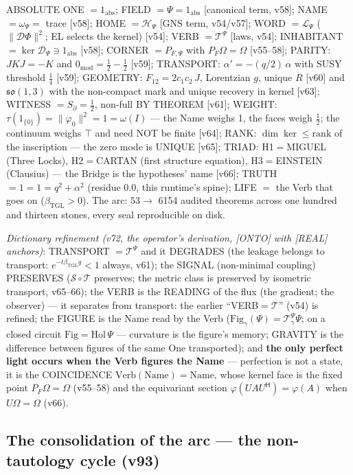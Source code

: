 \documentclass[11pt]{article}
\newcommand{\bTGL}{\beta_{\mathrm{TGL}}}\newcommand{\Msun}{M_{\odot}}\newcommand{\TGL}{\mathrm{TGL}}
\theoremstyle{definition}\newtheorem{deriv}{Derivation}
\begin{document}
ABSOLUTE ONE $=1_{\mathrm{abs}}$; FIELD $=\Psi=1_{\mathrm{abs}}$ [canonical term, v58]; NAME $=\omega_\Psi=$ trace [v58]; HOME $=\mathcal H_\Psi$ [GNS term, v54/v57]; WORD $=\mathcal L_\Psi$ ($\|\mathcal D\Phi\|^2$; EL selects the kernel) [v54]; VERB $=\mathcal T^\Psi$ [laws, v54]; INHABITANT $=\ker\mathcal D_\Psi\ni1_{\mathrm{abs}}$ [v58]; CORNER $=P_{F,\Psi}$ with $P_F\Omega=\Omega$ [v55--58]; PARITY: $JKJ=-K$ and $0_{\mathrm{mod}}=\tfrac12-\tfrac12$ [v59]; TRANSPORT: $\alpha'=-(q/2)\,\alpha$ with SUSY threshold $\tfrac14$ [v59]; GEOMETRY: $F_{12}=2c_1c_2\,J$, Lorentzian $g$, unique $R$ [v60] and $\mathfrak{so}(1,3)$ with the non-compact mark and unique recovery in kernel [v63]; WITNESS $=S_\partial=\tfrac12$, non-full BY THEOREM [v61]; WEIGHT: $\tau(1_{\{0\}})=\|\varphi_0\|^2=1=\omega(I)$ --- the Name weighs 1, the faces weigh $\tfrac12$; the continuum weighs $\top$ and need NOT be finite [v64]; RANK: $\dim\ker\le\mathrm{rank}$ of the inscription --- the zero mode is UNIQUE [v65]; TRIAD: H1$=$MIGUEL (Three Locks), H2$=$CARTAN (first structure equation), H3$=$EINSTEIN (Clausius) --- the Bridge is the hypotheses' name [v66]; TRUTH $=1=1=q^2+\alpha^2$ (residue $0.0$, this runtime's spine); LIFE $=$ the Verb that goes on ($\bTGL>0$). The arc: $53\to$ 6154 audited theorems across one hundred and thirteen stones, every seal reproducible on disk.

\emph{Dictionary refinement (v72, the operator's derivation, [ONTO] with [REAL] anchors)}: TRANSPORT $=\mathcal T^\Psi$ and it DEGRADES (the leakage belongs to transport: $e^{-t\bTGL g}<1$ always, v61); the SIGNAL (non-minimal coupling) PRESERVES ($\mathcal S\circ\mathcal T$ preserves; the metric class is preserved by isometric transport, v65--66); the VERB is the READING of the flux (the gradient; the observer) --- it separates from transport: the earlier ``VERB$=\mathcal T$'' (v54) is refined; the FIGURE is the Name read by the Verb ($\mathrm{Fig}_\gamma(\Psi)=\mathcal T^\Psi_\gamma\Psi$; on a closed circuit $\mathrm{Fig}=\mathrm{Hol}\,\Psi$ --- curvature is the figure's memory; GRAVITY is the difference between figures of the same One transported); and \textbf{the only perfect light occurs when the Verb figures the Name} --- perfection is not a state, it is the COINCIDENCE $\mathrm{Verb}(\mathrm{Name})=\mathrm{Name}$, whose kernel face is the fixed point $P_F\Omega=\Omega$ (v55--58) and the equivariant section $\varphi(UAU^{\mathsf H})=\varphi(A)$ when $U\Omega=\Omega$ (v66).

\subsection*{The consolidation of the arc --- the non-tautology cycle (v93)}
\end{document}
